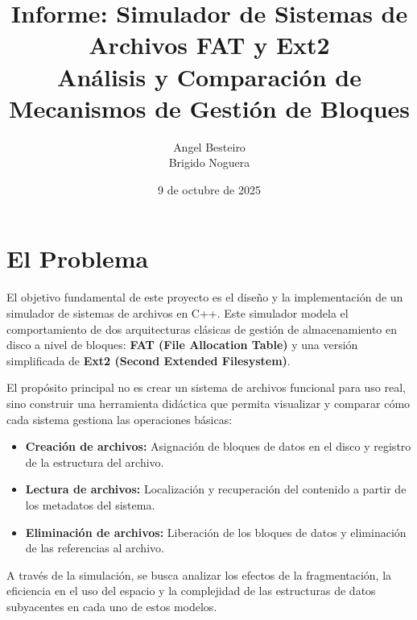 \documentclass[12pt, a4paper]{article}
\title{
    \textbf{Informe: Simulador de Sistemas de Archivos FAT y Ext2} \\
    \large Análisis y Comparación de Mecanismos de Gestión de Bloques
}
\author{Angel Besteiro \\ Brigido Noguera}
\date{9 de octubre de 2025}
\begin{document}
\begin{titlepage}
    \centering
    \vfill %
    \maketitle
    \vfill %
    \thispagestyle{empty}
\end{titlepage}


\newpage
{ %
    \renewcommand{\baselinestretch}{1.5} %
    \Large %
    \tableofcontents
}
\newpage


\section{El Problema}

El objetivo fundamental de este proyecto es el diseño y la implementación de un simulador de sistemas de archivos en C++. Este simulador modela el comportamiento de dos arquitecturas clásicas de gestión de almacenamiento en disco a nivel de bloques: \textbf{FAT (File Allocation Table)} y una versión simplificada de \textbf{Ext2 (Second Extended Filesystem)}.

El propósito principal no es crear un sistema de archivos funcional para uso real, sino construir una herramienta didáctica que permita visualizar y comparar cómo cada sistema gestiona las operaciones básicas:

\begin{itemize}
    \item \textbf{Creación de archivos:} Asignación de bloques de datos en el disco y registro de la estructura del archivo.
    \item \textbf{Lectura de archivos:} Localización y recuperación del contenido a partir de los metadatos del sistema.
    \item \textbf{Eliminación de archivos:} Liberación de los bloques de datos y eliminación de las referencias al archivo.
\end{itemize}

A través de la simulación, se busca analizar los efectos de la fragmentación, la eficiencia en el uso del espacio y la complejidad de las estructuras de datos subyacentes en cada uno de estos modelos.
\end{document}
